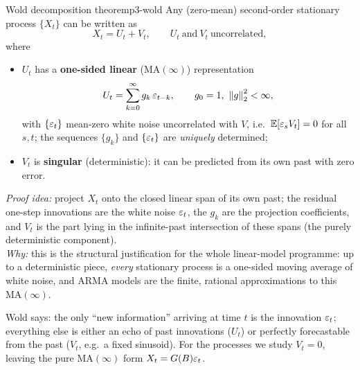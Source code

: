 \begin{theorem}{Wold decomposition theorem}{p3-wold}
Any (zero-mean) second-order stationary process $\{X_t\}$ can be written as
\[
X_t = U_t + V_t,
\qquad U_t\ \text{and}\ V_t\ \text{uncorrelated},
\]
where
\begin{itemize}
  \item $U_t$ has a \textbf{one-sided linear} ($\mathrm{MA}(\infty)$)
        representation
        \[
        U_t=\sum_{k=0}^{\infty}g_k\,\varepsilon_{t-k},\qquad g_0=1,\ \left\lVert g \right\rVert_2^2<\infty,
        \]
        with $\{\varepsilon_t\}$ mean-zero white noise uncorrelated with $V$,
        i.e.\ $\mathbb{E}[\varepsilon_s V_t]=0$ for all $s,t$; the sequences $\{g_k\}$ and
        $\{\varepsilon_t\}$ are \emph{uniquely} determined;
  \item $V_t$ is \textbf{singular} (deterministic): it can be predicted from its
        own past with zero error.
\end{itemize}
\textit{Proof idea:} project $X_t$ onto the closed linear span of its own past;
the residual one-step innovations are the white noise $\varepsilon_t$, the $g_k$ are the
projection coefficients, and $V_t$ is the part lying in the infinite-past
intersection of these spans (the purely deterministic component).\\
\textit{Why:} this is the structural justification for the whole linear-model
programme: up to a deterministic piece, \emph{every} stationary process is a
one-sided moving average of white noise, and ARMA models are the finite,
rational approximations to this $\mathrm{MA}(\infty)$.
\end{theorem}

\begin{intuition}
Wold says: the only ``new information'' arriving at time $t$ is the innovation
$\varepsilon_t$; everything else is either an echo of past innovations ($U_t$) or
perfectly forecastable from the past ($V_t$, e.g.\ a fixed sinusoid). For the
processes we study $V_t=0$, leaving the pure $\mathrm{MA}(\infty)$ form
$X_t=G(B)\varepsilon_t$.
\end{intuition}

